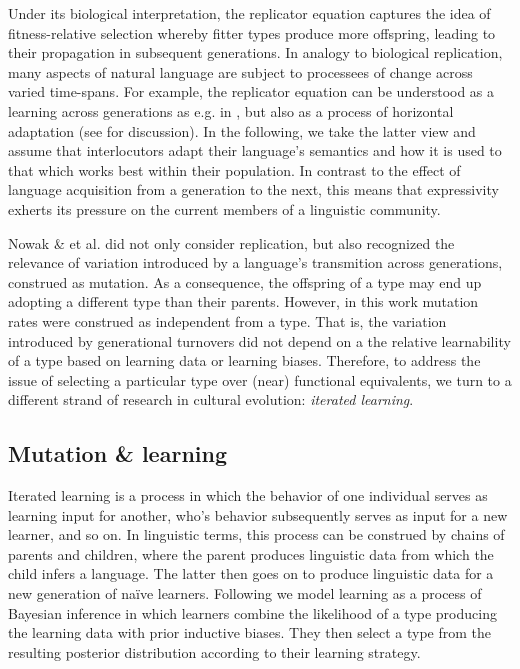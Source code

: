 \documentclass[a4paper]{article}
\begin{document}
Under its biological interpretation, the replicator equation captures the idea of fitness-relative selection whereby fitter types produce more offspring, leading to their propagation in subsequent generations. In analogy to biological replication, many aspects of natural language are subject to processees of change across varied time-spans. For example, the replicator equation can be understood as a learning across generations as e.g. in \citealt{nowak+etal:2002}, but also as a process of horizontal adaptation (see \citealt[\S3.3]{benz+etal:2005b} for discussion). In the following, we take the latter view and assume that interlocutors adapt their language's semantics and how it is used to that which works best within their population. In contrast to the effect of language acquisition from a generation to the next, this means that expressivity exherts its pressure on the current members of a linguistic community. 

Nowak \& et al. did not only consider replication, but also recognized the relevance of variation introduced by a language's transmition across generations, construed as mutation. As a consequence, the offspring of a type may end up adopting a different type than their parents. However, in this work mutation rates were construed as independent from a type. That is, the variation introduced by generational turnovers did not depend on a the relative learnability of a type based on learning data or learning biases. Therefore, to address the issue of selecting a particular type over (near) functional equivalents, we turn to a different strand of research in cultural evolution: {\em iterated learning}. 


\subsection{Mutation \& learning}
Iterated learning is a process in which the behavior of one individual serves as learning input for another, who's behavior subsequently serves as input for a new learner, and so on. In linguistic terms, this process can be construed by chains of parents and children, where the parent produces linguistic data from which the child infers a language. The latter then goes on to produce linguistic data for a new generation of na\"ive learners. Following \citet{griffiths+kalish:2007} we model learning as a process of Bayesian inference in which learners combine the likelihood of a type producing the learning data with prior inductive biases. They then select a type from the resulting posterior distribution according to their learning strategy. 
\end{document}
